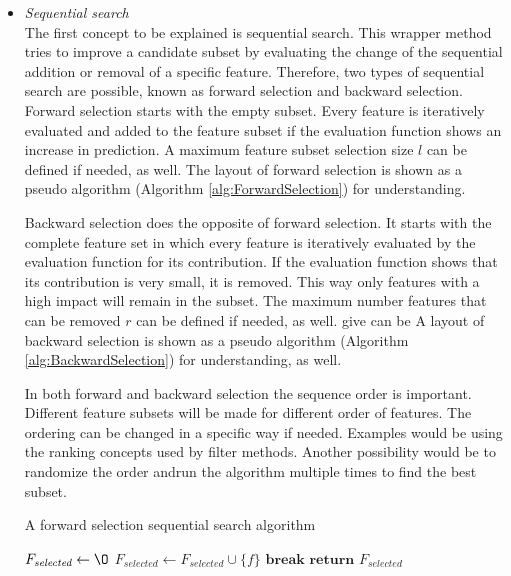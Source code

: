 \documentclass[10pt,a4paper]{article}
\begin{document}
	\begin{itemize}
		\item \textit{Sequential search} \\
		The first concept to be explained is sequential search. This wrapper method tries to improve a candidate subset by evaluating the change of the sequential addition or removal of a specific feature. Therefore, two types of sequential search are possible, known as forward selection and backward selection. Forward selection starts with the empty subset. Every feature is iteratively evaluated and added to the feature subset if the evaluation function shows an increase in prediction. A maximum feature subset selection size $l$  can be defined if needed, as well. The layout of forward selection is shown as a pseudo algorithm (Algorithm \ref{alg:ForwardSelection}) for understanding\cite{Reunanen2006}.
		
		Backward selection does the opposite of forward selection. It starts with the complete feature set in which every feature is iteratively evaluated by the evaluation function for its contribution. If the evaluation function shows that its contribution is very small, it is removed. This way only features with a high impact will remain in the subset. The maximum number features that can be removed $r$ can be defined if needed, as well. give can be A layout of backward selection is shown as a pseudo algorithm (Algorithm \ref{alg:BackwardSelection}) for understanding, as well\cite{Reunanen2006}.
		
		In both forward and backward selection the sequence order is important. Different feature subsets will be made for different order of features. The ordering can be changed in a specific way if needed. Examples would be using the ranking concepts used by filter methods. Another possibility would be to randomize the order andrun the algorithm multiple times to find the best subset\cite{Reunanen2006}.
		
		\begin{algorithm}[H]
			\caption{A forward selection sequential search algorithm\cite{Reunanen2006}}\label{alg:ForwardSelection}
			\begin{algorithmic}[1]
				\State $F_{\textit{selected}} \gets \O$				
											
					
				\State $F_{\textit{selected}} \gets F_{\textit{selected}} \cup \{f\}$	
				\EndIf
						
				\State $\textbf{break}$
				\EndIf
				\EndFor
				\State $\textbf{return } F_{\textit{selected}}$
				\EndProcedure
			\end{algorithmic}
		\end{algorithm}
	

\end{itemize}
\end{document}
